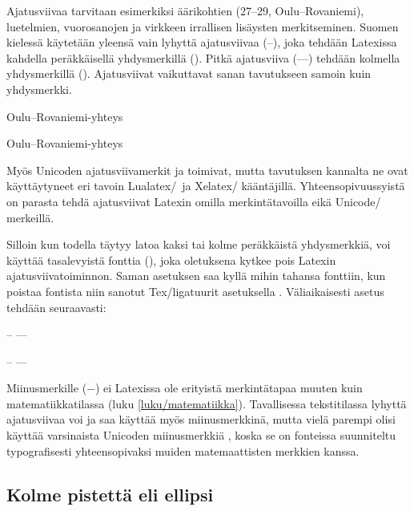 Ajatusviivaa tarvitaan esimerkiksi äärikohtien (27--29,
Oulu--Rova\-niemi), luetelmien, vuorosanojen ja virkkeen irrallisen
lisäysten merkitseminen. Suomen kielessä käytetään yleensä vain lyhyttä
ajatusviivaa \mbox{(--)}, joka tehdään Latexissa kahdella peräkkäisellä
yhdysmerkillä (\koodim{--}). Pitkä ajatusviiva \mbox{(---)} tehdään
kolmella yhdysmerkillä (\koodim{---}). Ajatusviivat vaikuttavat sanan
tavutukseen samoin kuin yhdysmerkki.

\begin{koodilohkosis}
Oulu--Rovaniemi-yhteys
\end{koodilohkosis}

\begin{tulossis}
  Oulu--Rovaniemi-yhteys
\end{tulossis}

\noindent
Myös Unicoden ajatusviivamerkit  ja
 toimivat, mutta tavutuksen kannalta ne ovat
käyttäytyneet eri tavoin Lualatex\-/\ ja Xelatex\-/ kääntäjillä.
Yhteensopivuussyistä on parasta tehdä ajatusviivat Latexin omilla
merkintätavoilla eikä Unicode\-/ merkeillä.

Silloin kun todella täytyy latoa kaksi tai kolme peräkkäistä
yhdysmerkkiä, voi käyttää tasalevyistä fonttia
(\komentoarg{--}), joka oletuksena kytkee pois Latexin
ajatusviivatoiminnon. Saman asetuksen saa kyllä mihin tahansa fonttiin,
kun poistaa fontista niin sanotut Tex\-/ligatuurit asetuksella
. Väliaikaisesti asetus tehdään
seuraavasti:

\begin{koodilohkosis}
{ -- ---}
\end{koodilohkosis}

\begin{tulossis}
  { -- ---}
\end{tulossis}

\noindent
Miinusmerkille (−) ei Latexissa ole erityistä merkintätapaa muuten kuin
matematiikkatilassa (luku \ref{luku/matematiikka}). Tavallisessa
tekstitilassa lyhyttä ajatusviivaa voi ja saa käyttää myös
miinusmerkkinä, mutta vielä parempi olisi käyttää varsinaista Unicoden
miinusmerkkiä , koska se on fonteissa
suunniteltu typografisesti yhteensopivaksi muiden matemaattisten
merkkien kanssa.

\subsection{Kolme pistettä eli ellipsi}

